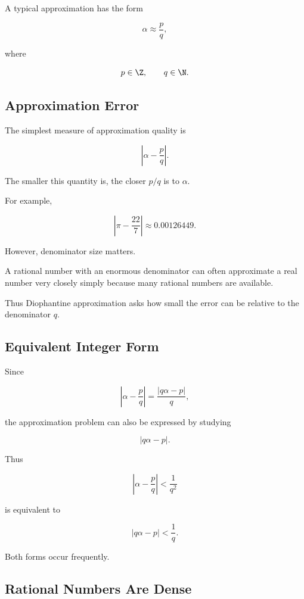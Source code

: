 A typical approximation has the form

\[ \alpha\approx\frac pq, \]

where

\[ p\in\Z,\qquad q\in\N. \]

\subsection{Approximation Error}
\label{subsec:diophantine-approximation-error}

The simplest measure of approximation quality is

\[ \left|\alpha-\frac pq\right|. \]

The smaller this quantity is, the closer \(p/q\) is to \(\alpha\).

For example,

\[ \left|\pi-\frac{22}{7}\right|\approx0.00126449. \]

However, denominator size matters.

A rational number with an enormous denominator can often approximate a real
number very closely simply because many rational numbers are available.

Thus Diophantine approximation asks how small the error can be relative to
the denominator \(q\).

\subsection{Equivalent Integer Form}
\label{subsec:approximation-integer-form}

Since

\[ \left|\alpha-\frac pq\right|=\frac{|q\alpha-p|}{q}, \]

the approximation problem can also be expressed by studying

\[ |q\alpha-p|. \]

Thus

\[ \left|\alpha-\frac pq\right|<\frac1{q^2} \]

is equivalent to

\[ |q\alpha-p|<\frac1q. \]

Both forms occur frequently.

\subsection{Rational Numbers Are Dense}
\label{subsec:rationals-dense-diophantine}

